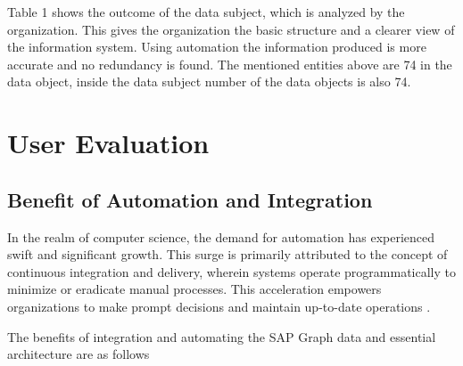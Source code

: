 \documentclass{article}
\begin{document}
Table 1 shows the outcome of the data subject, which is analyzed by the organization. This gives the organization the basic structure and a clearer view of the information system. Using automation the information produced is more accurate and no redundancy is found. The mentioned entities above are 74 in the data object, inside the data subject number of the data objects is also 74. 

\maketitle
\section{User Evaluation}


\maketitle
\subsection{Benefit of Automation and Integration}

In the realm of computer science, the demand for automation has experienced swift and significant growth. This surge is primarily attributed to the concept of continuous integration and delivery, wherein systems operate programmatically to minimize or eradicate manual processes. This acceleration empowers organizations to make prompt decisions and maintain up-to-date operations \parencite{wilcox2015}. 

The benefits of integration and automating the SAP Graph data and essential architecture are as follows
\end{document}
